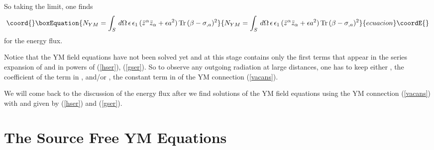 \documentclass[a4paper,twocolumn,prd,showpacs,amsmath,amssymb]{revtex4}
\begin{document}
So taking the \coordHE{} limit, one finds
\begin{equation}\coord{}\boxEquation{
N_{YM} = \int_{S} \, d\Omega \, \epsilon \, \epsilon_{1} \,
(\ddot{z}^{\alpha} \ddot{z}_{\alpha} + \epsilon a^2) \,
\mbox{Tr} \, (\beta - \sigma_{,a})^2 \label{fluxba}
}{
N_{YM} = \int_{S} \, d\Omega \, \epsilon \, \epsilon_{1} \,
(\ddot{z}^{\alpha} \ddot{z}_{\alpha} + \epsilon a^2) \,
\mbox{Tr} \, (\beta - \sigma_{,a})^2 }{ecuacion}\coordE{}\end{equation}
for the energy flux.

Notice that the YM field equations have not been solved
yet and at this stage \coordHE{} contains only the first terms that appear in
the series expansion of \coordHE{} and \coordHE{} in powers of \coordHE{} (\ref{hser}),
(\ref{gser}). So to observe any outgoing radiation at large distances,
one has to keep either \myHighlight{$\beta$}\coordHE{}, the coefficient of the \coordHE{} term in \coordHE{},
and/or \myHighlight{$\sigma$}\coordHE{}, the constant term in \coordHE{} of the YM connection (\ref{vacans}).

We will come back to the discussion of the energy flux \coordHE{} after we
find solutions of the YM field equations using the YM connection (\ref{vacans})
with \coordHE{} and \coordHE{} given by (\ref{hser}) and (\ref{gser}).

\section{\label{ymeqn} The Source Free YM Equations}
\end{document}
